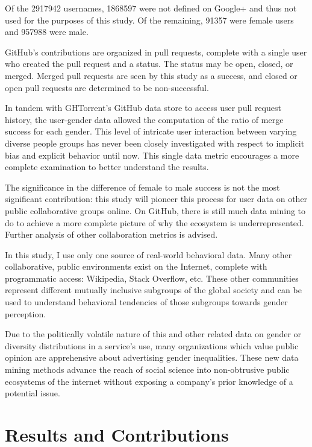 \documentclass[authoryear]{sigplanconf}
\begin{document}
Of the \num{2917942} usernames, \num{1868597} were not defined on Google+ and thus
not used for the purposes of this study. Of the remaining, \num{91357} were
female users and \num{957988} were male.

GitHub's contributions are organized in pull requests, complete with a single
user who created the pull request and a status. The status may be open, closed,
or merged. Merged pull requests are seen by this study as a success, and closed
or open pull requests are determined to be non-successful.

In tandem with GHTorrent's GitHub data store to
access user pull request history, the user-gender data allowed the computation of
the ratio of merge success for each gender. This level of intricate user interaction
between varying diverse people groups has never been closely investigated with
respect to implicit bias and explicit behavior until
now. This single data metric encourages a more complete examination to better
understand the results.

The significance in the difference of female to male success is not the most
significant contribution: this study will pioneer this process for user data on
other public collaborative groups online.
On GitHub, there is still much data mining to do to achieve a more complete
picture of why the ecosystem is underrepresented. Further analysis of other
collaboration metrics is advised.

In this study, I use only one source of real-world behavioral data.
Many other collaborative, public environments exist on the Internet, complete
with programmatic access: Wikipedia, Stack Overflow, etc. These other
communities represent different mutually inclusive subgroups of the global
society and can be used to understand behavioral tendencies of those subgroups
towards gender perception.

Due to the politically volatile nature of this and other related data on gender
or diversity distributions in a service's use, many organizations which value
public opinion are apprehensive about advertising gender inequalities. These new data
mining methods advance the reach of social science into non-obtrusive public
ecosystems of the internet without exposing a company's prior knowledge of a
potential issue.

\section{Results and Contributions}
\end{document}
